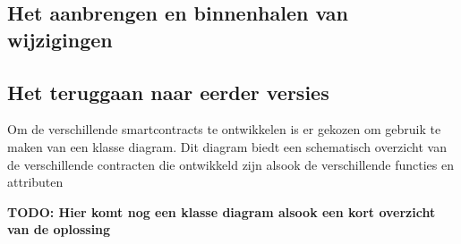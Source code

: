 \subsection{Het aanbrengen en binnenhalen van wijzigingen}

\subsection{Het teruggaan naar eerder versies}

Om de verschillende smartcontracts te ontwikkelen is er gekozen om gebruik te maken van een klasse diagram. Dit diagram biedt een schematisch overzicht van de verschillende contracten die ontwikkeld zijn alsook de verschillende functies en attributen

\textbf{TODO: Hier komt nog een klasse diagram alsook een kort overzicht van de oplossing}